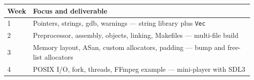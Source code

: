 \documentclass[11pt]{article}
\begin{document}
\bigskip

\begin{center}
\begin{tabular}{@{}p{} p{}@{}}
\hline
\textbf{Week} & \textbf{Focus and deliverable} \\
\hline
1 & Pointers, strings, gdb, warnings --- string library plus \texttt{Vec} \\
2 & Preprocessor, assembly, objects, linking, Makefiles --- multi-file build \\
3 & Memory layout, ASan, custom allocators, padding --- bump and free-list allocators \\
4 & POSIX I/O, fork, threads, FFmpeg example --- mini-player with SDL3 \\
\hline
\end{tabular}
\end{center}
\end{document}
